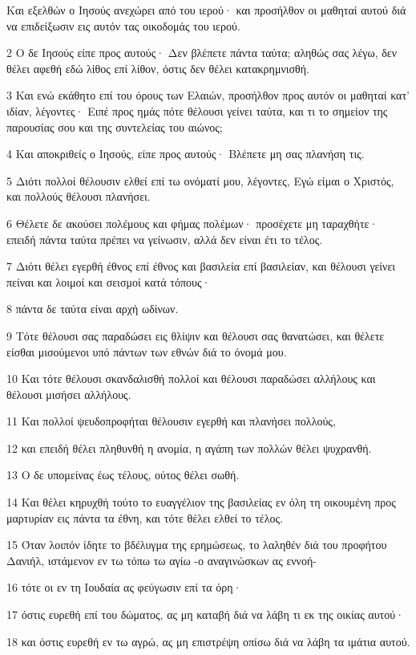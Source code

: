 \par Και εξελθών ο Ιησούς ανεχώρει από του ιερού· και προσήλθον οι μαθηταί αυτού διά να επιδείξωσιν εις αυτόν τας οικοδομάς του ιερού.
\par 2 Ο δε Ιησούς είπε προς αυτούς· Δεν βλέπετε πάντα ταύτα; αληθώς σας λέγω, δεν θέλει αφεθή εδώ λίθος επί λίθον, όστις δεν θέλει κατακρημνισθή.
\par 3 Και ενώ εκάθητο επί του όρους των Ελαιών, προσήλθον προς αυτόν οι μαθηταί κατ' ιδίαν, λέγοντες· Ειπέ προς ημάς πότε θέλουσι γείνει ταύτα, και τι το σημείον της παρουσίας σου και της συντελείας του αιώνος;
\par 4 Και αποκριθείς ο Ιησούς, είπε προς αυτούς· Βλέπετε μη σας πλανήση τις.
\par 5 Διότι πολλοί θέλουσιν ελθεί επί τω ονόματί μου, λέγοντες, Εγώ είμαι ο Χριστός, και πολλούς θέλουσι πλανήσει.
\par 6 Θέλετε δε ακούσει πολέμους και φήμας πολέμων· προσέχετε μη ταραχθήτε· επειδή πάντα ταύτα πρέπει να γείνωσιν, αλλά δεν είναι έτι το τέλος.
\par 7 Διότι θέλει εγερθή έθνος επί έθνος και βασιλεία επί βασιλείαν, και θέλουσι γείνει πείναι και λοιμοί και σεισμοί κατά τόπους·
\par 8 πάντα δε ταύτα είναι αρχή ωδίνων.
\par 9 Τότε θέλουσι σας παραδώσει εις θλίψιν και θέλουσι σας θανατώσει, και θέλετε είσθαι μισούμενοι υπό πάντων των εθνών διά το όνομά μου.
\par 10 Και τότε θέλουσι σκανδαλισθή πολλοί και θέλουσι παραδώσει αλλήλους και θέλουσι μισήσει αλλήλους.
\par 11 Και πολλοί ψευδοπροφήται θέλουσιν εγερθή και πλανήσει πολλούς,
\par 12 και επειδή θέλει πληθυνθή η ανομία, η αγάπη των πολλών θέλει ψυχρανθή.
\par 13 Ο δε υπομείνας έως τέλους, ούτος θέλει σωθή.
\par 14 Και θέλει κηρυχθή τούτο το ευαγγέλιον της βασιλείας εν όλη τη οικουμένη προς μαρτυρίαν εις πάντα τα έθνη, και τότε θέλει ελθεί το τέλος.
\par 15 Όταν λοιπόν ίδητε το βδέλυγμα της ερημώσεως, το λαληθέν διά του προφήτου Δανιήλ, ιστάμενον εν τω τόπω τω αγίω -ο αναγινώσκων ας εννοή-
\par 16 τότε οι εν τη Ιουδαία ας φεύγωσιν επί τα όρη·
\par 17 όστις ευρεθή επί του δώματος, ας μη καταβή διά να λάβη τι εκ της οικίας αυτού·
\par 18 και όστις ευρεθή εν τω αγρώ, ας μη επιστρέψη οπίσω διά να λάβη τα ιμάτια αυτού.
